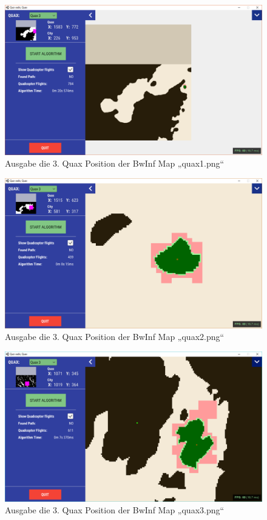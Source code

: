 \documentclass[a4paper,12pt]{article}
\begin{document}
\begin{figure}[H]
\centering
    \includegraphics[width=1\linewidth]{Bilder/Aufgabe3/Programm/quax1_03.png}
    \caption{Ausgabe die 3. Quax Position der BwInf Map „quax1.png“}
\end{figure}
\begin{figure}[H]
\centering
    \includegraphics[width=1\linewidth]{Bilder/Aufgabe3/Programm/quax2_03.png}
    \caption{Ausgabe die 3. Quax Position der BwInf Map „quax2.png“}
\end{figure}
\begin{figure}[H]
\centering
    \includegraphics[width=1\linewidth]{Bilder/Aufgabe3/Programm/quax3_03.png}
    \caption{Ausgabe die 3. Quax Position der BwInf Map „quax3.png“}
\end{figure}
\end{document}
